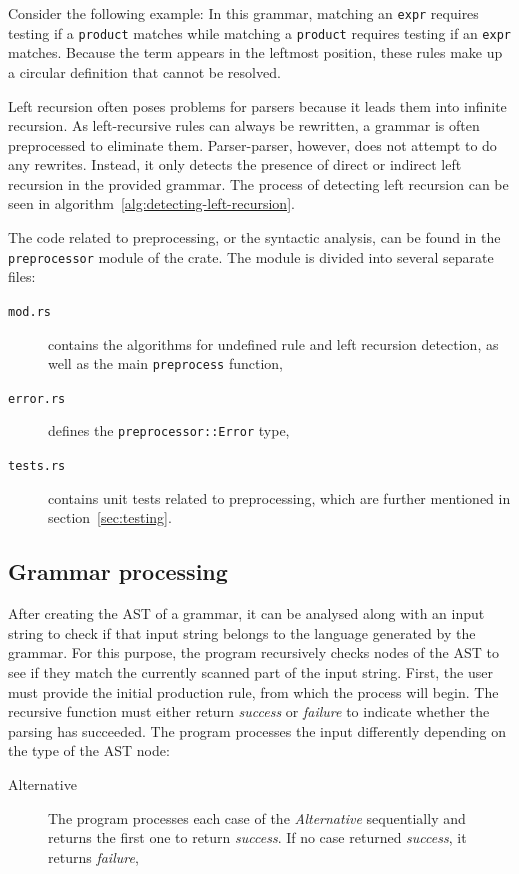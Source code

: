 \documentclass[english,engineering]{wizthesis}
\newcommand{\paraphrase}[1]{#1}
\newcommand{\thisproject}{Parser-parser}
\begin{document}
Consider the following example:
\paraphrase{In this grammar, matching an \texttt{expr} requires testing if a
\texttt{product} matches while matching a \texttt{product} requires testing if
an \texttt{expr} matches. Because the term appears in the leftmost position,
these rules make up a circular definition that cannot be resolved.}

\paraphrase{Left recursion often poses problems for parsers because it leads
them into infinite recursion. As left-recursive rules can always be rewritten, a
grammar is often preprocessed to eliminate them.} \thisproject{}, however, does
not attempt to do any rewrites. Instead, it only detects the presence of direct
or indirect left recursion in the provided grammar. The process of detecting
left recursion can be seen in algorithm~\ref{alg:detecting-left-recursion}.

The code related to preprocessing, or the syntactic analysis, can be found in
the \texttt{preprocessor} module of the crate. The module is divided into
several separate files:
\begin{description}
  \item[\texttt{mod.rs}] contains the algorithms for undefined rule and left
  recursion detection, as well as the main \texttt{preprocess} function,
  \item[\texttt{error.rs}] defines the \texttt{preprocessor::Error}
  type,
  \item[\texttt{tests.rs}] contains unit tests related to preprocessing,
  which are further mentioned in section~\ref{sec:testing}.
\end{description}

\subsection{Grammar processing} \label{sbs:grammar-processing}

After creating the AST of a grammar, it can be analysed along with an input
string to check if that input string belongs to the language generated by the
grammar. For this purpose, the program recursively checks nodes of the AST to
see if they match the currently scanned part of the input string. First, the
user must provide the initial production rule, from which the process will
begin. The recursive function must either return \emph{success} or
\emph{failure} to indicate whether the parsing has succeeded. The program
processes the input differently depending on the type of the AST node:
\begin{description}
  \item[Alternative] The program processes each case of the \emph{Alternative}
  sequentially and returns the first one to return \emph{success}. If no case
  returned \emph{success}, it returns \emph{failure},
\end{description}
\end{document}
